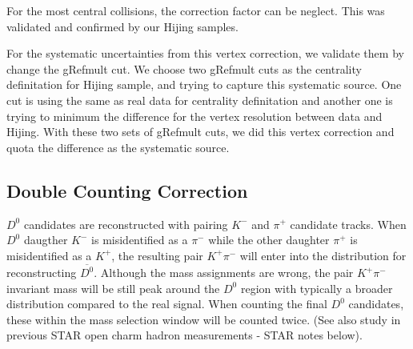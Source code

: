 For the most central collisions, the correction factor can be neglect. This was validated and confirmed by our Hijing samples.


For the systematic uncertainties from this vertex correction, we validate them by change the gRefmult cut. We choose two gRefmult cuts as the centrality definitation for Hijing sample, and trying to capture this systematic source. One cut is using the same as real data for centrality definitation and another one is trying to minimum the difference for the vertex resolution between data and Hijing. With these two sets of gRefmult cuts, we did this vertex correction and quota the difference as the systematic source.

\subsection{Double Counting Correction} 





$D^0$ candidates are reconstructed with pairing $K^-$ and $\pi^+$ candidate tracks. When $D^0$ daugther $K^-$ is misidentified as a $\pi^-$ while the other daughter $\pi^+$ is misidentified as a $K^+$, the resulting pair $K^+\pi^-$ will enter into the distribution for reconstructing $\overline{D^0}$. Although the mass assignments are wrong, the pair $K^+\pi^-$ invariant mass will be still peak around the $D^0$ region with typically a broader distribution compared to the real signal. When counting the final $D^0$ candidates, these within the mass selection window will be counted twice. (See also study in previous STAR open charm hadron measurements - STAR notes below).

